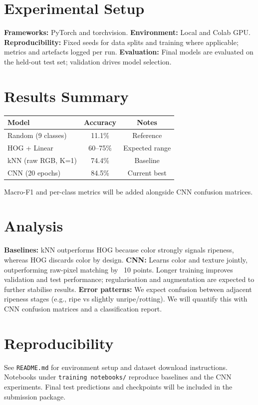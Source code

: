 \documentclass[11pt,a4paper]{article}
\begin{document}
\section{Experimental Setup}
\textbf{Frameworks:} PyTorch and torchvision.\newline
\textbf{Environment:} Local and Colab GPU.\newline
\textbf{Reproducibility:} Fixed seeds for data splits and training where applicable; metrics and artefacts logged per run.\newline
\textbf{Evaluation:} Final models are evaluated on the held-out test set; validation drives model selection.

\section{Results Summary}
\begin{center}
\begin{tabular}{lcc}
\toprule
Model & Accuracy & Notes \\
\midrule
Random (9 classes) & 11.1\% & Reference \\
HOG + Linear & 60--75\% & Expected range \\
kNN (raw RGB, K=1) & 74.4\% & Baseline \\
CNN (20 epochs) & 84.5\% & Current best \\
\bottomrule
\end{tabular}
\end{center}
Macro-F1 and per-class metrics will be added alongside CNN confusion matrices.

\section{Analysis}
\textbf{Baselines:} kNN outperforms HOG because color strongly signals ripeness, whereas HOG discards color by design.\newline
\textbf{CNN:} Learns color and texture jointly, outperforming raw-pixel matching by ~10 points. Longer training improves validation and test performance; regularisation and augmentation are expected to further stabilise results.\newline
\textbf{Error patterns:} We expect confusion between adjacent ripeness stages (e.g., ripe vs slightly unripe/rotting). We will quantify this with CNN confusion matrices and a classification report.

\section{Reproducibility}
See \texttt{README.md} for environment setup and dataset download instructions. Notebooks under \texttt{training notebooks/} reproduce baselines and the CNN experiments. Final test predictions and checkpoints will be included in the submission package.
\end{document}
